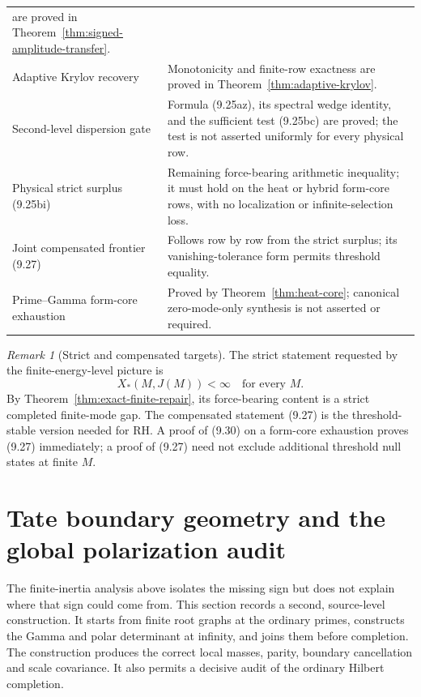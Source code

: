 \documentclass[11pt]{amsart}
\theoremstyle{definition}
\theoremstyle{remark}
\newtheorem{remark}[theorem]{Remark}
\begin{document}
\begin{center}
\begin{tabular}{>{\raggedright\arraybackslash}p{}
                >{\raggedright\arraybackslash}p{}}
are proved in Theorem~\ref{thm:signed-amplitude-transfer}.\\
Adaptive Krylov recovery & Monotonicity and finite-row exactness are
proved in Theorem~\ref{thm:adaptive-krylov}.\\
Second-level dispersion gate & Formula (9.25az), its spectral wedge
identity, and the sufficient test (9.25bc) are proved; the test is not
asserted uniformly for every physical row.\\
Physical strict surplus (9.25bi) & Remaining force-bearing arithmetic
inequality; it must hold on the heat or hybrid form-core rows, with no
localization or infinite-selection loss.\\
Joint compensated frontier (9.27) & Follows row by row from the strict
surplus; its vanishing-tolerance form permits threshold equality.\\
Prime--Gamma form-core exhaustion & Proved by
Theorem~\ref{thm:heat-core}; canonical zero-mode-only synthesis is not
asserted or required.\\
\bottomrule
\end{tabular}
\end{center}

\begin{remark}[Strict and compensated targets]
The strict statement requested by the finite-energy-level picture is
\[
 \boxed{X_*(M,J(M))<\infty\quad\text{for every }M.}
\tag{9.30}
\]
By Theorem~\ref{thm:exact-finite-repair}, its force-bearing content is a
strict completed finite-mode gap.  The compensated statement (9.27) is
the threshold-stable version needed for RH.  A proof of (9.30) on a
form-core exhaustion proves (9.27) immediately; a proof of (9.27) need
not exclude additional threshold null states at finite \(M\).
\end{remark}

\section{Tate boundary geometry and the global polarization audit}
\label{sec:polarization-audit}

The finite-inertia analysis above isolates the missing sign but does not
explain where that sign could come from.  This section records a second,
source-level construction.  It starts from finite root graphs at the
ordinary primes, constructs the Gamma and polar determinant at infinity,
and joins them before completion.  The construction produces the correct
local masses, parity, boundary cancellation and scale covariance.  It also
permits a decisive audit of the ordinary Hilbert completion.
\end{document}
